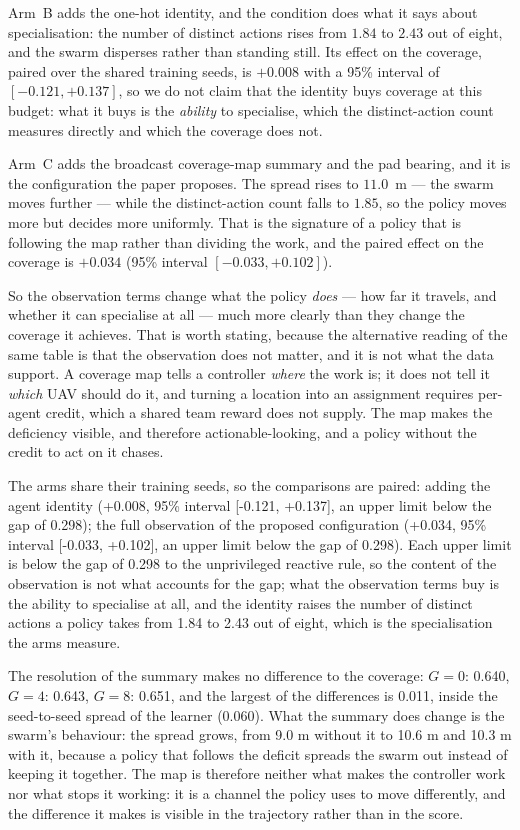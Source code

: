\documentclass[conference]{IEEEtran}
\begin{document}
Arm~B adds the one-hot identity, and the condition does what it says about
specialisation: the number of distinct actions rises from $1.84$ to
$2.43$ out of eight, and the swarm disperses rather than standing
still.  Its effect on the coverage, paired over the shared training seeds,
is $+0.008$ with a 95\% interval of $[-0.121, +0.137]$, so we do
not claim that the identity buys coverage at this budget: what it buys is
the \emph{ability} to specialise, which the distinct-action count measures
directly and which the coverage does not.

Arm~C adds the broadcast coverage-map summary and the pad bearing, and it
is the configuration the paper proposes.  The spread rises to
$11.0$~m --- the swarm moves further --- while the distinct-action
count falls to $1.85$, so the policy moves more but decides more
uniformly.  That is the signature of a policy that is following the map
rather than dividing the work, and the paired effect on the coverage is
$+0.034$ (95\% interval $[-0.033, +0.102]$).

So the observation terms change what the policy \emph{does} --- how far it
travels, and whether it can specialise at all --- much more clearly than
they change the coverage it achieves.  That is worth stating, because the
alternative reading of the same table is that the observation does not
matter, and it is not what the data support.  A coverage map tells a
controller \emph{where} the work is; it does not tell it \emph{which} UAV
should do it, and turning a location into an assignment requires per-agent
credit, which a shared team reward does not supply.  The map makes the
deficiency visible, and therefore actionable-looking, and a policy without
the credit to act on it chases.

The arms share their training seeds, so the comparisons are paired: adding the agent identity (+0.008, 95\% interval [-0.121, +0.137], an upper limit below the gap of 0.298); the full observation of the proposed configuration (+0.034, 95\% interval [-0.033, +0.102], an upper limit below the gap of 0.298).  Each upper limit is below the gap of 0.298 to the unprivileged reactive rule, so the content of the observation is not what accounts for the gap; what the observation terms buy is the ability to specialise at all, and the identity raises the number of distinct actions a policy takes from 1.84 to 2.43 out of eight, which is the specialisation the arms measure.

The resolution of the summary makes no difference to the coverage: $G=0$: 0.640, $G=4$: 0.643, $G=8$: 0.651, and the largest of the differences is 0.011, inside the seed-to-seed spread of the learner (0.060).  What the summary does change is the swarm's behaviour: the spread grows, from 9.0 m without it to 10.6 m and 10.3 m with it, because a policy that follows the deficit spreads the swarm out instead of keeping it together.  The map is therefore neither what makes the controller work nor what stops it working: it is a channel the policy uses to move differently, and the difference it makes is visible in the trajectory rather than in the score.
\end{document}
